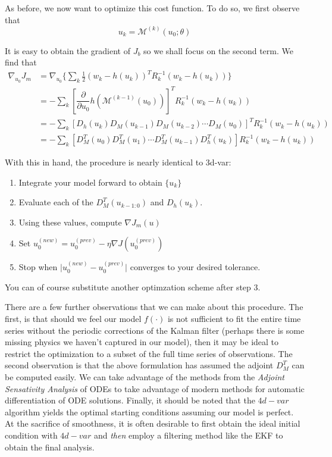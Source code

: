 As before, we now want to optimize this cost function. To do so, we first observe that
\begin{equation}
    u_k = \mathcal{M}^{(k)}(u_0; \theta)
\end{equation}

It is easy to obtain the gradient of $J_b$ so we shall focus on the second term. We find that
\begin{align}
    \nabla_{u_0}J_m &= \nabla_{u_0}\Big\{ \sum_k \frac{1}{2}  \left(w_k - h(u_k) \right)^TR_k^{-1}\left(w_k - h(u_k) \right) \Big\}\\
                    &= - \sum_k \left[\dfrac{\partial }{\partial u_0}h\left(\mathcal{M}^{(k-1)}(u_0)\right) \right]^T R_k^{-1}\left(w_k - h(u_k) \right)\\
                    &= - \sum_k \left[D_h(u_k)D_M(u_{k-1})D_M(u_{k-2})\cdots D_M(u_0) \right]^T R_k^{-1}\left(w_k - h(u_k) \right)\\
                    &= - \sum_k \left[D_M^T(u_0)D_M^T(u_1)\cdots D_M^T(u_{k-1})D_h^T(u_k) \right] R_k^{-1}\left(w_k - h(u_k) \right)
\end{align}

With this in hand, the procedure is nearly identical to 3d-var:
\begin{enumerate}
\item Integrate your model forward to obtain $\{u_k\}$
\item Evaluate each of the $D_M^T(u_{k-1:0})$ and $D_h(u_k)$.
\item Using these values, compute $\nabla J_m(u)$
\item Set $u_0^{(new)} = u_0^{(prev)} - \eta \nabla J(u_0^{(prev)})$
\item Stop when $\lvert u_0^{(new)} - u_0^{(prev)} \rvert$ converges to your desired tolerance.
\end{enumerate}
You can of course substitute another optimzation scheme after step 3.

There are a few further observations that we can make about this procedure. The first, is that should we feel our model $f(\cdot)$ is not sufficient to fit the entire time series without the periodic corrections of the Kalman filter (perhaps there is some missing physics we haven't captured in our model), then it may be ideal to restrict the optimization to a subset of the full time series of observations. The second observation is that the above formulation has assumed the adjoint $D_M^T$ can be computed easily. We can take advantage of the methods from the \textit{Adjoint Sensativity Analysis} of ODEs to take advantage of modern methods for automatic differentiation of ODE solutions. Finally, it should be noted that the $4d-var$ algorithm yields the optimal starting conditions assuming our model is perfect. At the sacrifice of smoothness, it is often desirable to first obtain the ideal initial condition with $4d-var$ and \textit{then} employ a filtering method like the EKF to obtain the final analysis.




